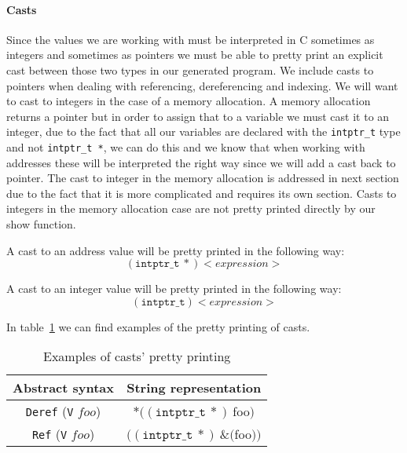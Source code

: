 \paragraph{Casts}
Since the values we are working with must be interpreted in C sometimes as integers and sometimes as pointers we must be able to pretty print an explicit cast between those two types in our generated program.
We include casts to pointers when dealing with referencing, dereferencing and indexing.
We will want to cast to integers in the case of a memory allocation.
A memory allocation returns a pointer but in order to assign that to a variable we must cast it to an integer, due to the fact that all our variables are declared with the \verb|intptr_t| type and not \verb|intptr_t *|, we can do this and we know that when working with addresses these will be interpreted the right way since we will add a cast back to pointer.
The cast to integer in the memory allocation is addressed in next section due to the fact that it is more complicated and requires its own section.
Casts to integers in the memory allocation case are not pretty printed directly by our show function.


A cast to an address value will be pretty printed in the following way:
\begin{equation*}
(\mathtt{intptr\_t}\ *) <expression>
\end{equation*}

A cast to an integer value will be pretty printed in the following way:
\begin{equation*}
(\mathtt{intptr\_t}) <expression>
\end{equation*}

In table~\ref{tab:pretty_casts} we can find examples of the pretty printing of casts.

\begin{table}[h!]
\centering
\begin{tabular}{|c|c|}
  \hline
  \textbf{Abstract syntax} & \textbf{String representation} \\ [0.5ex]
  \hline \hline
  \verb|Deref| (\verb|V| $foo$) & $*((\mathtt{intptr\_t}\ *)\ $foo$)$ \\
  \verb|Ref| (\verb|V| $foo$)   & $((\mathtt{intptr\_t}\ *)\ \&($foo$))$ \\
  \hline
\end{tabular}

\caption{Examples of casts' pretty printing}
\label{tab:pretty_casts}
\end{table}


